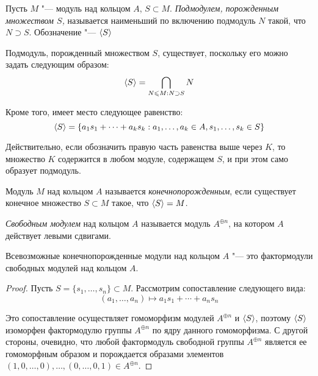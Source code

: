 \begin{definition}
	Пусть $M$ "--- модуль над кольцом $A$, $S \subset M$. \textit{Подмодулем, порожденным множеством $S$,} называется наименьший по включению подмодуль $N$ такой, что $N \supset S$. Обозначение "--- $\langle S \rangle$
\end{definition}

\begin{note}
	Подмодуль, порожденный множеством $S$, существует, поскольку его можно задать следующим образом:
	\[\langle S \rangle = \bigcap_{N \leqslant M : N \supset S}N\]
	
	Кроме того, имеет место следующее равенство:
	\[\langle S \rangle = \{a_1s_1 + \dotsb + a_ks_k : a_1, \dotsc, a_k \in A, s_1, \dotsc, s_k \in S\}\]
	
	Действительно, если обозначить правую часть равенства выше через $K$, то множество $K$ содержится в любом модуле, содержащем $S$, и при этом само образует подмодуль.
\end{note}

\begin{definition}
	Модуль $M$ над кольцом $A$ называется \textit{конечнопорожденным}, если существует конечное множество $S \subset M$ такое, что $\langle S \rangle = M$.
\end{definition}

\begin{definition}
	\textit{Свободным модулем} над кольцом $A$ называется модуль $A^{\oplus n}$, на котором $A$ действует левыми сдвигами.
\end{definition}

\begin{proposition}
	Всевозможные конечнопорожденные модули над кольцом $A$ "--- это фактормодули свободных модулей над кольцом $A$.
\end{proposition}

\begin{proof}
	Пусть $S = \{s_1, \dotsc, s_n\} \subset M$. Рассмотрим сопоставление следующего вида:
	\[(a_1, \dotsc, a_n) \mapsto a_1s_1 + \dotsb + a_ns_n\]
	
	Это сопоставление осуществляет гомоморфизм модулей $A^{\oplus n}$ и $\langle S \rangle$, поэтому $\langle S \rangle$ изоморфен фактормодулю группы $A^{\oplus n}$ по ядру данного гомоморфизма. С другой стороны, очевидно, что любой фактормодуль свободной группы $A^{\oplus n}$ является ее гомоморфным образом и порождается образами элементов $(1, 0, \dotsc, 0), \dotsc, (0, \dotsc, 0, 1) \in A^{\oplus n}$.
\end{proof}

